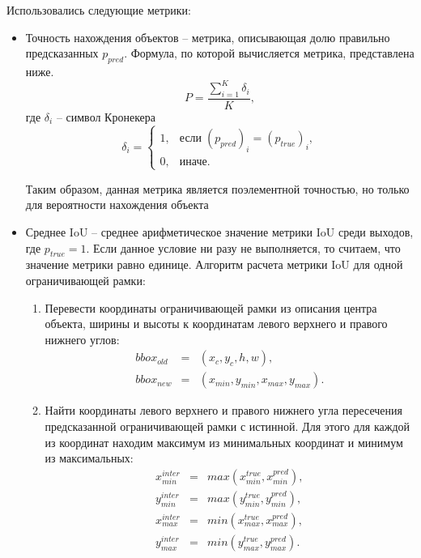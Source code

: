 \documentclass[14pt,a4paper]{extarticle}
\begin{document}
Использовались следующие метрики:
\begin{itemize}
\item Точность нахождения объектов -- метрика, описывающая долю правильно предсказанных $p_{pred}$. Формула, по которой вычисляется метрика, представлена ниже.
\begin{equation}
P = \dfrac{\sum_{i=1}^K \delta_i}{K},
\end{equation}
где $\delta_i$ -- символ Кронекера
\begin{equation}
\delta_i = \left\{
\begin{array}{ll}
1, & \text{если} \; (p_{pred})_i = (p_{true})_i,\\
0, & \text{иначе}.
\end{array}
\right.
\end{equation}
 
Таким образом, данная метрика является поэлементной точностью, но только для вероятности нахождения объекта
\item Среднее IoU -- среднее арифметическое значение метрики IoU среди выходов, где $p_{true} = 1$. Если данное условие ни разу не выполняется, то считаем, что значение метрики равно единице.
Алгоритм расчета метрики IoU для одной ограничивающей рамки:
\begin{enumerate}
\item Перевести координаты ограничивающей рамки из описания центра объекта, ширины и высоты к координатам левого верхнего и правого нижнего углов:
\begin{eqnarray}
bbox_{old} & = &(x_c, y_c, h, w),\\
bbox_{new} & = &(x_{min}, y_{min}, x_{max}, y_{max}).
\end{eqnarray}

\item Найти координаты левого верхнего и правого нижнего угла пересечения предсказанной ограничивающей рамки с истинной. Для этого для каждой из координат находим максимум из минимальных координат и минимум из максимальных:
\begin{eqnarray}
x_{min}^{inter} & = & max(x_{min}^{true}, x_{min}^{pred}),\\
y_{min}^{inter} & = & max(y_{min}^{true}, y_{min}^{pred}),\\
x_{max}^{inter} & = & min(x_{max}^{true}, x_{max}^{pred}),\\
y_{max}^{inter} & = & min(y_{max}^{true}, y_{max}^{pred}).
\end{eqnarray}


\end{enumerate}
\end{itemize}
\end{document}

